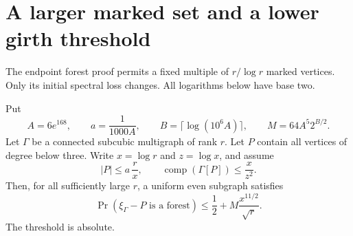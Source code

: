 \section{A larger marked set and a lower girth threshold}
\label{sec:random-larger-marker}

The endpoint forest proof permits a fixed multiple of $r/\log r$ marked vertices.
Only its initial spectral loss changes.
All logarithms below have base two.

\begin{theorem}
\label{thm:random-larger-marker}
Put
\[
 A=6e^{168},\qquad a=\frac1{1000A},\qquad
 B=\lceil\log(10^6A)\rceil,\qquad M=64A^5 2^{B/2}.
\]
Let $\Gamma$ be a connected subcubic multigraph of rank $r$.
Let $P$ contain all vertices of degree below three.
Write $x=\log r$ and $z=\log x$, and assume
\[
 |P|\le a\,\frac r x,\qquad
 \operatorname{comp}(\Gamma[P])\le\frac x{z^2}.
\]
Then, for all sufficiently large $r$, a uniform even subgraph satisfies
\[
 \Pr(\xi_\Gamma-P\text{ is a forest})
 \le\frac12+M\frac{x^{11/2}}{\sqrt r}.
\]
The threshold is absolute.
\end{theorem}

